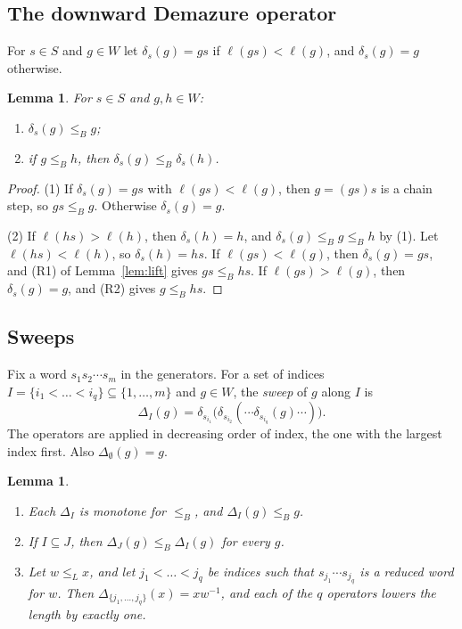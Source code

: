\documentclass[11pt]{amsart}
\newtheorem{lemma}[theorem]{Lemma}
\theoremstyle{definition}
\theoremstyle{remark}
\numberwithin{equation}{section}
\newcommand{\leL}{\le_L}
\newcommand{\leB}{\le_B}
\begin{document}
\subsection{The downward Demazure operator}
For \(s\in S\) and \(g\in W\) let \(\delta_s(g)=gs\) if \(\ell(gs)<\ell(g)\), and \(\delta_s(g)=g\) otherwise.

\begin{lemma}\label{lem:demazure}
For \(s\in S\) and \(g,h\in W\):
\begin{enumerate}
\item \(\delta_s(g)\leB g\);
\item if \(g\leB h\), then \(\delta_s(g)\leB\delta_s(h)\).
\end{enumerate}
\end{lemma}

\begin{proof}
(1) If \(\delta_s(g)=gs\) with \(\ell(gs)<\ell(g)\), then \(g=(gs)s\) is a chain step, so \(gs\leB g\). Otherwise \(\delta_s(g)=g\).

(2) If \(\ell(hs)>\ell(h)\), then \(\delta_s(h)=h\), and \(\delta_s(g)\leB g\leB h\) by (1). Let \(\ell(hs)<\ell(h)\), so \(\delta_s(h)=hs\). If \(\ell(gs)<\ell(g)\), then \(\delta_s(g)=gs\), and (R1) of Lemma~\ref{lem:lift} gives \(gs\leB hs\). If \(\ell(gs)>\ell(g)\), then \(\delta_s(g)=g\), and (R2) gives \(g\leB hs\).
\end{proof}

\subsection{Sweeps}
Fix a word \(s_1s_2\cdots s_m\) in the generators. For a set of indices \(I=\{i_1<\dots<i_q\}\subseteq\{1,\dots,m\}\) and \(g\in W\), the \emph{sweep} of \(g\) along \(I\) is
\[
\Delta_I(g)=\delta_{s_{i_1}}\bigl(\delta_{s_{i_2}}(\cdots\delta_{s_{i_q}}(g)\cdots)\bigr).
\]
The operators are applied in decreasing order of index, the one with the largest index first. Also \(\Delta_\emptyset(g)=g\).

\begin{lemma}\label{lem:sweep}
\begin{enumerate}
\item Each \(\Delta_I\) is monotone for \(\leB\), and \(\Delta_I(g)\leB g\).
\item If \(I\subseteq J\), then \(\Delta_J(g)\leB\Delta_I(g)\) for every \(g\).
\item Let \(w\leL x\), and let \(j_1<\dots<j_q\) be indices such that \(s_{j_1}\cdots s_{j_q}\) is a reduced word for \(w\). Then \(\Delta_{\{j_1,\dots,j_q\}}(x)=xw^{-1}\), and each of the \(q\) operators lowers the length by exactly one.
\end{enumerate}
\end{lemma}
\end{document}
